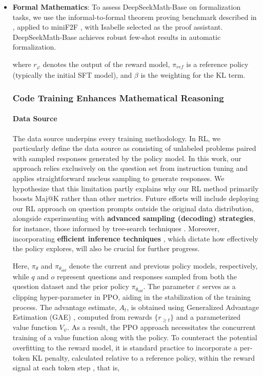 \begin{itemize}[topsep=0pt]
\begin{itemize}[topsep=0pt]
\item \textbf{Formal Mathematics}: To assess DeepSeekMath-Base on formalization tasks, we use the informal-to-formal theorem proving benchmark described in \citep{dsp_proof}, applied to miniF2F \citep{minif2f}, with Isabelle \citep{isabelle} selected as the proof assistant. DeepSeekMath-Base achieves robust few-shot results in automatic formalization.

where $r_\varphi$ denotes the output of the reward model, $\pi_{ref}$ is a reference policy (typically the initial SFT model), and $\beta$ is the weighting for the KL term.

\subsubsection{Code Training Enhances Mathematical Reasoning}

\paragraph{Data Source} The data source underpins every training methodology. In RL, we particularly define the data source as consisting of unlabeled problems paired with sampled responses generated by the policy model. In this work, our approach relies exclusively on the question set from instruction tuning and applies straightforward nucleus sampling to generate responses. We hypothesize that this limitation partly explains why our RL method primarily boosts Maj@K rather than other metrics. Future efforts will include deploying our RL approach on question prompts outside the original data distribution, alongside experimenting with \textbf{advanced sampling (decoding) strategies}, for instance, those informed by tree-search techniques \citep{yao2023tree}. Moreover, incorporating \textbf{efficient inference techniques} \citep{xia-etal-2023-speculative,leviathan2023fast,kwon2023efficient,xia2024unlocking}, which dictate how effectively the policy explores, will also be crucial for further progress.

Here, $\pi_{\theta}$ and $\pi_{\theta_{old}}$ denote the current and previous policy models, respectively, while $q$ and $o$ represent questions and responses sampled from both the question dataset and the prior policy $\pi_{\theta_{old}}$. The parameter $\varepsilon$ serves as a clipping hyper-parameter in PPO, aiding in the stabilization of the training process. The advantage estimate, $A_t$, is obtained using Generalized Advantage Estimation (GAE) \citep{gae}, computed from rewards $\{r_{\ge t}\}$ and a parameterized value function $V_{\psi}$. As a result, the PPO approach necessitates the concurrent training of a value function along with the policy. To counteract the potential overfitting to the reward model, it is standard practice to incorporate a per-token KL penalty, calculated relative to a reference policy, within the reward signal at each token step \citep{ouyang2022training}, that is,


\end{itemize}
\end{itemize}
